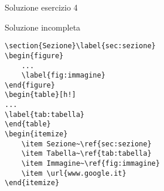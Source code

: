 \begin{frame}[fragile]{Soluzione esercizio 4}

\begin{block}{Soluzione incompleta}
\begin{code}
\begin{verbatim}
\section{Sezione}\label{sec:sezione}
\begin{figure}
	...
	\label{fig:immagine}
\end{figure}
\begin{table}[h!]
...
\label{tab:tabella}
\end{table}
\begin{itemize}
	\item Sezione~\ref{sec:sezione}
	\item Tabella~\ref{tab:tabella}
	\item Immagine~\ref{fig:immagine}
	\item \url{www.google.it}
\end{itemize}
\end{verbatim}
\end{code}
\end{block}

\end{frame}